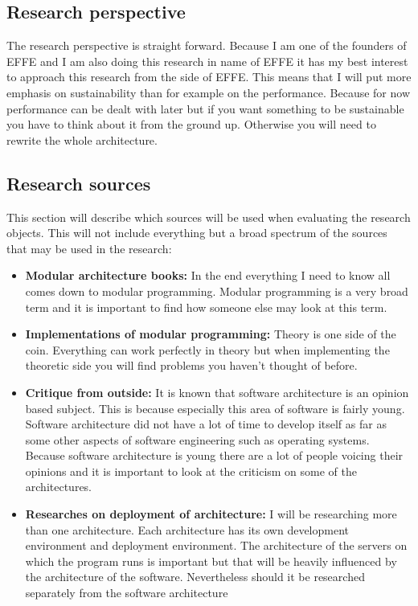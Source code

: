 \subsection{Research perspective}
The research perspective is straight forward. Because I am one of the founders of EFFE and I am also doing this research in name of EFFE it has my best interest to approach this research from the side of EFFE. This means that I will put more emphasis on sustainability than for example on the performance. Because for now performance can be dealt with later but if you want something to be sustainable you have to think about it from the ground up. Otherwise you will need to rewrite the whole architecture.

\subsection{Research sources}
This section will describe which sources will be used when evaluating the research objects. This will not include everything but a broad spectrum of the sources that may be used in the research:

\begin{itemize}
	\item \textbf{Modular architecture books: }In the end everything I need to know all comes down to modular programming. Modular programming is a very broad term and it is important to find how someone else may look at this term.
	
	\item \textbf{Implementations of modular programming: }Theory is one side of the coin. Everything can work perfectly in theory but when implementing the theoretic side you will find problems you haven't thought of before.
	
	\item \textbf{Critique from outside: }It is known that software architecture is an opinion based subject. This is because especially this area of software is fairly young. Software architecture did not have a lot of time to develop itself as far as some other aspects of software engineering such as operating systems. Because software architecture is young there are a lot of people voicing their opinions and it is important to look at the criticism on some of the architectures.
	
	\item \textbf{Researches on deployment of architecture: }I will be researching more than one architecture. Each architecture has its own development environment and deployment environment. The architecture of the servers on which the program runs is important but that will be heavily influenced by the architecture of the software. Nevertheless should it be researched separately from the software architecture
\end{itemize}


